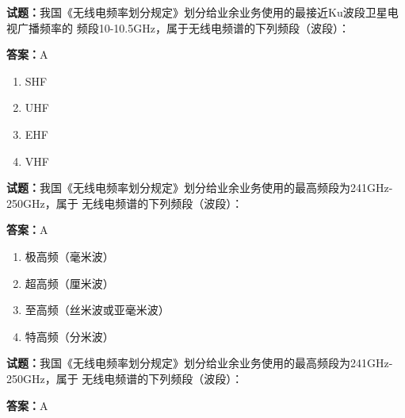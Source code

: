 \documentclass{ctexbook}
\begin{document}




\vspace{1em}

\textbf{试题：}我国《无线电频率划分规定》划分给业余业务使用的最接近Ku波段卫星电视广播频率的
频段10-10.5GHz，属于无线电频谱的下列频段（波段）： 

\textbf{答案：}A 

\begin{enumerate}[leftmargin=3em]
  \item SHF 

  \item UHF 

  \item EHF 

  \item VHF 

\end{enumerate}





\vspace{1em}

\textbf{试题：}我国《无线电频率划分规定》划分给业余业务使用的最高频段为241GHz-250GHz，属于
无线电频谱的下列频段（波段）： 

\textbf{答案：}A 

\begin{enumerate}[leftmargin=3em]
  \item 极高频（毫米波） 

  \item 超高频（厘米波） 

  \item 至高频（丝米波或亚毫米波） 

  \item 特高频（分米波） 

\end{enumerate}






\vspace{1em}

\textbf{试题：}我国《无线电频率划分规定》划分给业余业务使用的最高频段为241GHz-250GHz，属于
无线电频谱的下列频段（波段）： 

\textbf{答案：}A 
\end{document}
